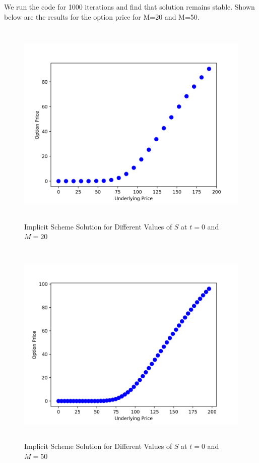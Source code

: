 \documentclass[12pt]{report}
\begin{document}
We run the code for 1000 iterations and find that solution remains stable. Shown below are the results for the option price for M=20 and M=50.

\begin{figure}[H]
	\centering
	\includegraphics[height=10cm,width=13cm]{Implicit_20}
	\caption{Implicit Scheme Solution for Different Values of $S$ at $t= 0$ and $M= 20$}
\end{figure}

\begin{figure}[H]
	\centering
	\includegraphics[height=10cm,width=13cm]{Implicit_50}
	\caption{Implicit Scheme Solution for Different Values of $S$ at $t= 0$ and $M= 50$}
\end{figure}
\end{document}
